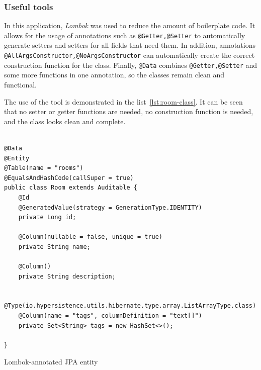 \subsubsection{Useful tools}\label{subsubsec:useful-tools}
In this application, \textit{Lombok} was used to reduce the amount of boilerplate code.
It allows for the usage of annotations such as \texttt{@Getter,@Setter} to automatically generate setters and setters for all fields that need them.
In addition, annotations \texttt{@AllArgsConstructor,@NoArgsConstructor} can automatically create the correct construction function for the class.
Finally, \texttt{@Data} combines \texttt{@Getter,@Setter} and some more functions in one annotation, so the classes remain clean and functional.

The use of the tool is demonstrated in the list~\ref{lst:room-class}.
It can be seen that no setter or getter functions are needed, no construction function is needed, and the class looks clean and complete.


\begin{listing}[H]
    \begin{verbatim}

@Data
@Entity
@Table(name = "rooms")
@EqualsAndHashCode(callSuper = true)
public class Room extends Auditable {
    @Id
    @GeneratedValue(strategy = GenerationType.IDENTITY)
    private Long id;

    @Column(nullable = false, unique = true)
    private String name;

    @Column()
    private String description;

    @Type(io.hypersistence.utils.hibernate.type.array.ListArrayType.class)
    @Column(name = "tags", columnDefinition = "text[]")
    private Set<String> tags = new HashSet<>();

}
    \end{verbatim}
    \caption{Lombok-annotated JPA entity}
    \label{lst:room-class}
\end{listing}


